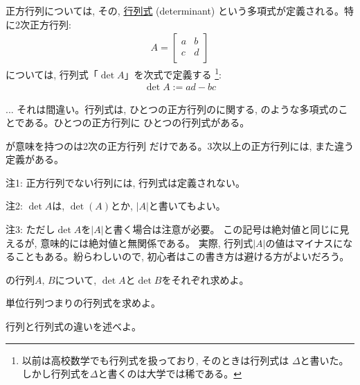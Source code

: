 正方行列については, その, \underline{行列式} (determinant)
という多項式が定義される。特に2次正方行列:
\begin{eqnarray}A=\begin{bmatrix}
a & b \\
c & d \\
\end{bmatrix}\end{eqnarray}
については, 行列式「$\det A$」を次式で定義する
\footnote{以前は高校数学でも行列式を扱っており, そのときは行列式は
$\Delta$と書いた。しかし行列式を$\Delta$と書くのは大学では稀である。}:
\begin{eqnarray}
\det A:=ad-bc\label{eq:define_det2D}
\end{eqnarray}

\begin{freqmiss}{\small{}
... それは間違い。行列式は, ひとつの正方行列のに関する, 
のような多項式のことである。ひとつの正方行列に
ひとつの行列式がある。}\end{freqmiss}

が意味を持つのは2次の正方行列
だけである。3次以上の正方行列には, また違う定義がある。

{\small 注1: 正方行列でない行列には, 行列式は定義されない。}

{\small 注2: $\det A$は, $\det (A)$とか, $|A|$と書いてもよい。}

{\small 注3: ただし$\det A$を$|A|$と書く場合は注意が必要。
この記号は絶対値と同じに見えるが, 意味的には絶対値と無関係である。
実際, 行列式$|A|$の値はマイナスになることもある。紛らわしいので, 
初心者はこの書き方は避ける方がよいだろう。}
\hv

\begin{q}\label{q:matrix_det2D} の行列$A,\, B$について, 
$\det A$と$\det B$をそれぞれ求めよ。
\end{q}

\begin{q}\label{q:matrix_detunit2D} 単位行列つまりの行列式を求めよ。\end{q}

\begin{q}\label{q:matrix_det_difference} 行列と行列式の違いを述べよ。\end{q}

